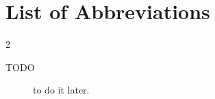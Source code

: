 \chapter*{List of Abbreviations}

\begin{multicols}{2}
\raggedright
\begin{description}
\item [TODO] to do it later.
\end{description}
\end{multicols}

